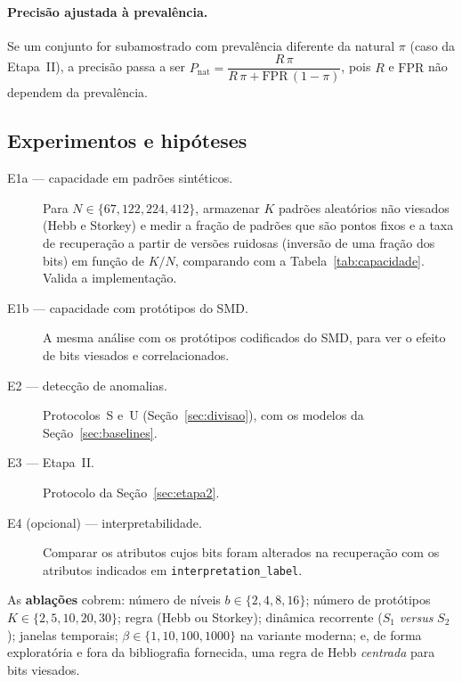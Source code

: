 \paragraph{Precisão ajustada à prevalência.} Se um conjunto for subamostrado com prevalência diferente da natural
$\pi$ (caso da Etapa~II), a precisão passa a ser $P_{\mathrm{nat}}=\dfrac{R\,\pi}{R\,\pi+\mathrm{FPR}\,(1-\pi)}$,
pois $R$ e $\mathrm{FPR}$ não dependem da prevalência.

\subsection{Experimentos e hipóteses}\label{sec:experimentos}
\begin{description}
  \item[E1a --- capacidade em padrões sintéticos.] Para $N\in\{67,122,224,412\}$, armazenar $K$ padrões
        aleatórios não viesados (Hebb e Storkey) e medir a fração de padrões que são pontos fixos e a taxa de
        recuperação a partir de versões ruidosas (inversão de uma fração dos bits) em função de $K/N$,
        comparando com a Tabela~\ref{tab:capacidade}. Valida a implementação.
  \item[E1b --- capacidade com protótipos do SMD.] A mesma análise com os protótipos codificados do SMD,
        para ver o efeito de bits viesados e correlacionados.
  \item[E2 --- detecção de anomalias.] Protocolos~S e~U (Seção~\ref{sec:divisao}), com os modelos da
        Seção~\ref{sec:baselines}.
  \item[E3 --- Etapa~II.] Protocolo da Seção~\ref{sec:etapa2}.
  \item[E4 (opcional) --- interpretabilidade.] Comparar os atributos cujos bits foram alterados na recuperação
        com os atributos indicados em \texttt{interpretation\_label}.
\end{description}
\noindent As \textbf{ablações} cobrem: número de níveis $b\in\{2,4,8,16\}$; número de protótipos
$K\in\{2,5,10,20,30\}$; regra (Hebb ou Storkey); dinâmica recorrente ($S_1$ \emph{versus} $S_2$); janelas
temporais; $\beta\in\{1,10,100,1000\}$ na variante moderna; e, de forma exploratória e fora da bibliografia
fornecida, uma regra de Hebb \emph{centrada} para bits viesados.


